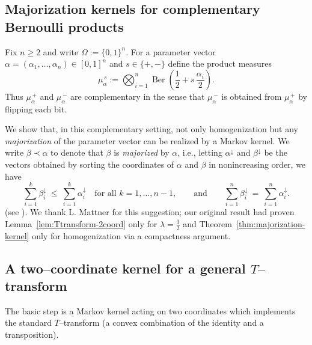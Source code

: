 \documentclass[11pt]{amsart}
\theoremstyle{plain}
\theoremstyle{definition}
\DeclareMathOperator{\Ber}{Ber}
\begin{document}
\begin{appendix}

\section{Majorization kernels for complementary Bernoulli products}
\label{app:majorization}

Fix $n\ge2$ and write $\Omega:=\{0,1\}^n$.
For a parameter vector $\alpha=(\alpha_1,\dots,\alpha_n)\in[0,1]^n$ and $s\in\{+,-\}$ define the product measures
\[
\mu_{\alpha}^{\,s}
:=\bigotimes_{i=1}^n \Ber\!\left(\frac12+s\,\frac{\alpha_i}{2}\right).
\]
Thus $\mu_{\alpha}^{\,+}$ and $\mu_{\alpha}^{\,-}$ are complementary in the sense that
$\mu_{\alpha}^{\,-}$ is obtained from $\mu_{\alpha}^{\,+}$ by flipping each bit.

We show that, in this complementary setting, not only homogenization but any
\emph{majorization} of the parameter vector can be realized by a Markov kernel.
We write $\beta\prec\alpha$ to denote that $\beta$ is \emph{majorized} by $\alpha$, i.e., letting
$\alpha^{\downarrow}$ and $\beta^{\downarrow}$ be the vectors obtained by sorting the coordinates of
$\alpha$ and $\beta$ in nonincreasing order, we have
\[
\sum_{i=1}^k \beta_i^{\downarrow}\ \le\ \sum_{i=1}^k \alpha_i^{\downarrow}
\quad\text{for all }k=1,\dots,n-1,
\qquad\text{and}\qquad
\sum_{i=1}^n \beta_i^{\downarrow}\ =\ \sum_{i=1}^n \alpha_i^{\downarrow}.
\]
(see \cite[Ch.~1]{marshall2011inequalities}).
We thank L. Mattner \cite{Mattner2026} for this suggestion;
our original result had proven Lemma~\ref{lem:Ttransform-2coord}
only for $\lambda=\frac12$
and Theorem~\ref{thm:majorization-kernel} only for homogenization
via a compactness argument.

\subsection*{A two--coordinate kernel for a general $T$--transform}
The basic step is a Markov kernel acting on two coordinates which implements the
standard $T$--transform (a convex combination of the identity and a transposition).


\end{appendix}
\end{document}
